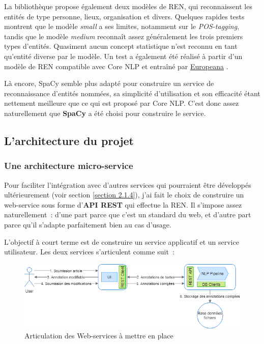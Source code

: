 La bibliothèque propose également deux modèles de REN, qui reconnaissent les entités de type personne, lieux, organisation et divers. Quelques rapides tests montrent que le modèle \textit{small} a ses limites, notamment sur le \textit{POS-tagging}, tandis que le modèle \textit{medium} reconnaît assez généralement les trois premiers types d'entités. Quasiment aucun concept statistique n'est reconnu en tant qu'entité diverse par le modèle. Un test a également été réalisé à partir d'un modèle de REN compatible avec Core NLP et entraîné par \href{http://lab.kbresearch.nl/static/html/eunews.html}{Europeana} \cite{europeana-ner}. %
\newline

Là encore, SpaCy semble plus adapté pour construire un service de reconnaissance d'entités nommées, sa simplicité d'utilisation et son efficacité étant nettement meilleure que ce qui est proposé par Core NLP. C'est donc assez naturellement que \textbf{SpaCy} a été choisi pour construire le service. 
\label{section 3.1.4}

\subsection{L'architecture du projet}

\subsubsection{Une architecture micro-service}
Pour faciliter l'intégration avec d'autres services qui pourraient être développés ultérieurement (voir section \ref{section 2.1.4}), j'ai fait le choix de construire un web-service sous forme d'\textbf{API REST} qui effectue la REN. Il s'impose assez naturellement~: d'une part parce que c'est un standard du web, et d'autre part parce qu'il s'adapte parfaitement bien au cas d'usage.
\newline

L'objectif à court terme est de construire un service applicatif et un service utilisateur. Les deux services s'articulent comme suit~:
\vspace{10pt}
\begin{figure}[H]
    \centering
\includegraphics[scale=0.62]{images/Archi-pipeline-web.png}
    \caption{Articulation des Web-services à mettre en place}
    \label{fig:archi-pipeline-web}
\end{figure}
\vspace{10pt}

